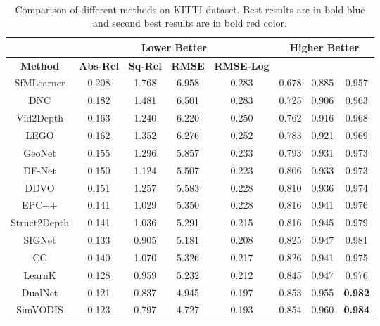 \documentclass[journal]{IEEEtran}
\begin{document}
\begin{table*}[t]
\centering
\captionsetup{justification=centering}
\caption{\\Comparison of different methods on KITTI dataset. Best results are in bold blue and second best results are in bold red color.}
\begin{tabular}{|c|cccc|ccc|}
\hline
\textbf{} & \multicolumn{4}{c|}{\textbf{Lower Better}} & \multicolumn{3}{c|}{\textbf{Higher Better}} \\ \hline\hline
\textbf{Method} & \multicolumn{1}{c|}{\textbf{Abs-Rel}} & \multicolumn{1}{c|}{\textbf{Sq-Rel}} & \multicolumn{1}{c|}{\textbf{RMSE}} & \textbf{RMSE-Log} & \multicolumn{1}{c|}{} & \multicolumn{1}{c|}{} &  \\ \hline\hline
SfMLearner\cite{Zhou2017} & 0.208 & 1.768 & 6.958 & 0.283 & 0.678 & 0.885 & 0.957 \\ \hline
DNC\cite{Yang2015} & 0.182 & 1.481 & 6.501 & 0.283 & 0.725 & 0.906 & 0.963 \\ \hline
Vid2Depth\cite{Mahjourian} & 0.163 & 1.240 & 6.220 & 0.250 & 0.762 & 0.916 & 0.968 \\ \hline
LEGO\cite{Yang2018} & 0.162 & 1.352 & 6.276 & 0.252 & 0.783 & 0.921 & 0.969 \\ \hline
GeoNet\cite{Yin} & 0.155 & 1.296 & 5.857 & 0.233 & 0.793 & 0.931 & 0.973 \\ \hline
DF-Net\cite{Zou} & 0.150 & 1.124 & 5.507 & 0.223 & 0.806 & 0.933 & 0.973 \\ \hline
DDVO\cite{Wang} & 0.151 & 1.257 & 5.583 & 0.228 & 0.810 & 0.936 & 0.974 \\ \hline
EPC++\cite{Luo2018} & 0.141 & 1.029 & 5.350 & 0.228 & 0.816 & 0.941 & 0.976 \\ \hline
Struct2Depth\cite{Casser} & 0.141 & 1.036 & 5.291 & 0.215 & 0.816 & 0.945 & 0.979 \\ \hline
SIGNet\cite{Meng} & 0.133 & 0.905 & 5.181 & 0.208 & 0.825 & 0.947 & 0.981 \\ \hline
CC\cite{Flow} & 0.140 & 1.070 & 5.326 & 0.217 & 0.826 & 0.941 & 0.975 \\ \hline
LearnK\cite{Gordon} & 0.128 & 0.959 & 5.232 & 0.212 & 0.845 & 0.947 & 0.976 \\ \hline
DualNet\cite{Zhou} & 0.121 & 0.837 & 4.945 & 0.197 & 0.853 & 0.955 & {\color[HTML]{FE0000} \textbf{0.982}}
 \\ \hline
SimVODIS\cite{kim} & 0.123 & 0.797 & 4.727 & 0.193 & 0.854 & 0.960 & {\color[HTML]{3166FF} \textbf{0.984}}
\\ \hline

\end{tabular}
\end{table*}
\end{document}
